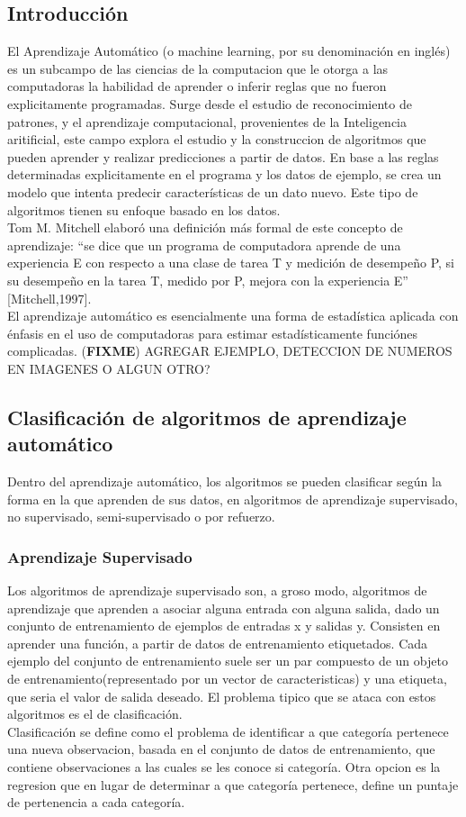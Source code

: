 \documentclass[a4paper,11pt,spanish]{book}
\newcommand*{\FIXME}[1]{{(\textbf{FIXME}) {#1}}}
\begin{document}
    \subsection{Introducción}
      El Aprendizaje Automático (o machine learning, por su denominación en inglés) es un subcampo de las ciencias de la computacion que le otorga a las computadoras la habilidad de aprender o inferir reglas que no fueron explicitamente programadas.
      Surge desde el estudio de reconocimiento de patrones, y el aprendizaje computacional, provenientes de la Inteligencia aritificial, este campo explora el estudio y la construccion de algoritmos
      que pueden aprender y realizar predicciones a partir de datos. En base a las reglas determinadas explicitamente en el programa y los datos de ejemplo, se crea un modelo que intenta predecir
      características de un dato nuevo. Este tipo de algoritmos tienen su enfoque basado en los datos.\\
      Tom M. Mitchell elaboró una definición más formal de este concepto de aprendizaje: “se dice que un programa de computadora aprende de una experiencia E con respecto a una clase 
      de tarea T y medición de desempeño P, si su desempeño en la tarea T, medido por P, mejora con la experiencia E” [Mitchell,1997].\\
      El aprendizaje automático es esencialmente una forma de estadística aplicada con énfasis en el uso de computadoras para estimar estadísticamente funciónes complicadas.
      \FIXME{AGREGAR EJEMPLO, DETECCION DE NUMEROS EN IMAGENES O ALGUN OTRO?}

    \subsection{Clasificación de algoritmos de aprendizaje automático}
      Dentro del aprendizaje automático, los algoritmos se pueden clasificar según la forma en la que aprenden de sus datos, en algoritmos de aprendizaje supervisado, no supervisado, 
      semi-supervisado o por refuerzo.

      \subsubsection{Aprendizaje Supervisado}
	Los algoritmos de aprendizaje supervisado son, a groso modo, algoritmos de aprendizaje que aprenden a asociar alguna entrada con alguna salida, 
	dado un conjunto de entrenamiento de ejemplos de entradas x y salidas y.
	Consisten en aprender una función, a partir de datos de entrenamiento etiquetados. Cada ejemplo del conjunto de entrenamiento suele ser un par
	compuesto de un objeto de entrenamiento(representado por un vector de caracteristicas) y una etiqueta, que seria el valor de salida deseado.
	El problema tipico que se ataca con estos algoritmos es el de clasificación. \\
	Clasificación se define como el problema de identificar a que categoría pertenece una nueva observacion,
	basada en el conjunto de datos de entrenamiento, que contiene observaciones a las cuales se les conoce si categoría.
	Otra opcion es la regresion que en lugar de determinar a que categoría pertenece, define un puntaje de pertenencia a cada categoría.
	
\end{document}
